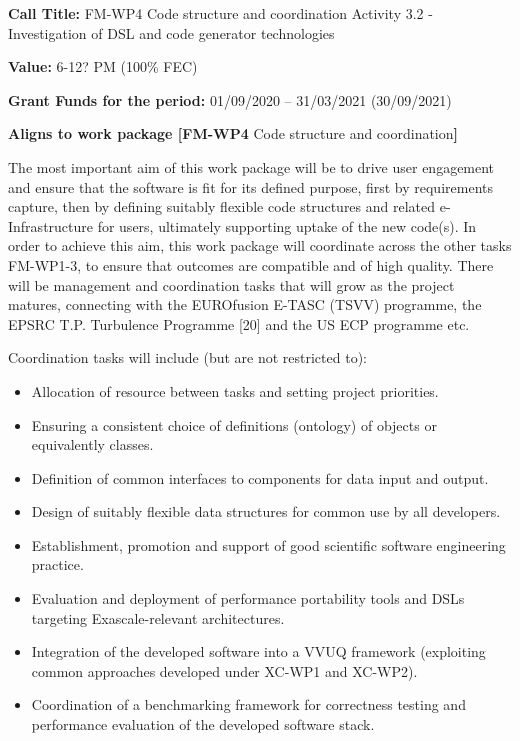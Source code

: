 \documentclass{article}
\begin{document}
\textbf{Call Title:} FM-WP4 Code structure and coordination Activity 3.2 - Investigation 
of DSL and code generator technologies

\textbf{Value:} 6-12? PM (100\% FEC)

\textbf{Grant Funds for the period: }01/09/2020 -- 31/03/2021 (30/09/2021)

\textbf{Aligns to work package [FM-WP4 }Code structure and coordination\textbf{]}

The most important aim of this work package will be to drive user engagement and 
ensure that the software is fit for its defined purpose, first by requirements 
capture, then by defining suitably flexible code structures and related e-Infrastructure 
for users, ultimately supporting uptake of the new code(s). In order to achieve 
this aim, this work package will coordinate across the other tasks FM-WP1-3, to 
ensure that outcomes are compatible and of high quality. There will be management 
and coordination tasks that will grow as the project matures, connecting with the 
EUROfusion E-TASC (TSVV) programme, the EPSRC T.P. Turbulence Programme [20] and 
the US ECP programme etc. 

Coordination tasks will include (but are not restricted to): 

\begin{itemize}
\item Allocation of resource between tasks and setting project priorities. 

\item Ensuring a consistent choice of definitions (ontology) of objects or equivalently 
classes. 

\item Definition of common interfaces to components for data input and output. 

\item Design of suitably flexible data structures for common use by all developers. 
{\color{color18} \textbf{ }}

\item Establishment, promotion and support of good scientific software engineering 
practice. 

\item Evaluation and deployment of performance portability tools and DSLs targeting 
Exascale-relevant architectures. 

\item Integration of the developed software into a VVUQ framework (exploiting common 
approaches developed under XC-WP1 and XC-WP2). 

\item Coordination of a benchmarking framework for correctness testing and performance 
evaluation of the developed software stack. 
\end{itemize}
\end{document}
